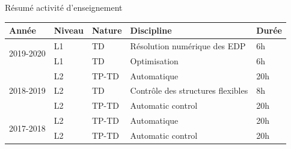 \documentclass[aspectratio=169, french]{beamer}
\begin{document}
\begin{frame}{Résumé activité d'enseignement}
	\begin{table}
		\centering
		\begin{tabular}{p{}p{}p{}p{}p{}}
			\hline
			Année & Niveau & Nature  & Discipline & Durée  \\
			\hline
			\multirow{2}{*}{2019-2020} & L1 & TD &  Résolution numérique des EDP & 6h \\
			& L1 & TD &  Optimisation & 6h \\
			\hline
			\multirow{3}{*}{2018-2019} & L2  & TP-TD  & Automatique & 20h \\
			& L2  & TD     & Contrôle des structures flexibles & 8h \\
			& L2  & TP-TD  & Automatic control & 20h \\
			\hline
			\multirow{2}{*}{2017-2018} & L2  & TP-TD  & Automatique & 20h \\
			& L2  & TP-TD  & Automatic control & 20h \\				   
			\hline
		\end{tabular}


	\end{table}
\end{frame}
\end{document}
